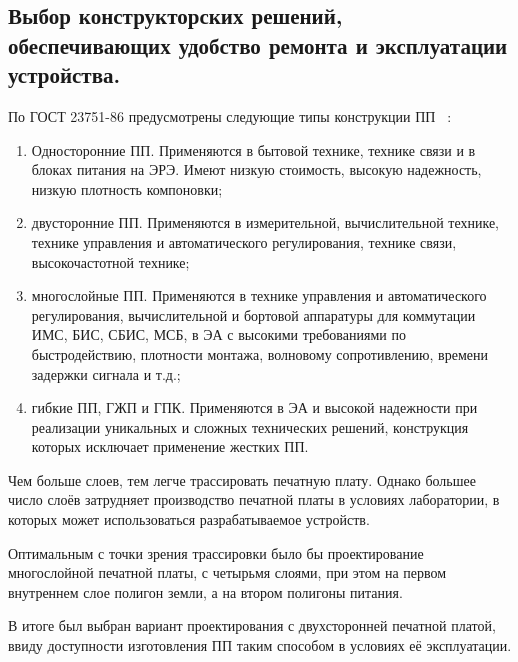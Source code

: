 \subsection{Выбор конструкторских решений, 
  обеспечивающих удобство ремонта
  и эксплуатации устройства.}

По ГОСТ 23751-86 предусмотрены следующие типы конструкции ПП
~\cite{PirogovaEngineering}:
\begin{enumerate}

\item Односторонние ПП. Применяются в бытовой технике, технике связи и
  в блоках питания на ЭРЭ. Имеют низкую стоимость, высокую надежность,
  низкую плотность компоновки;

\item двусторонние ПП. Применяются в измерительной, вычислительной
  технике, технике управления и автоматического регулирования,
  технике связи, высокочастотной технике;

\item многослойные ПП. Применяются в технике управления и
  автоматического регулирования,
  вычислительной и бортовой аппаратуры для
  коммутации ИМС, БИС, СБИС, МСБ, в ЭА с высокими требованиями по быстродействию,
  плотности монтажа,  волновому сопротивлению, времени задержки сигнала и т.д.;

\item гибкие ПП, ГЖП и ГПК. Применяются в ЭА и высокой надежности
  при реализации уникальных и сложных технических решений,
  конструкция которых исключает применение жестких ПП.
\end{enumerate}

Чем больше слоев, тем легче трассировать печатную плату.
Однако большее число слоёв затрудняет производство печатной платы
в условиях лаборатории, в которых может использоваться разрабатываемое
устройств.

Оптимальным с точки зрения трассировки было бы проектирование
многослойной печатной платы, с четырьмя слоями, при этом на первом
внутреннем слое полигон земли, а на втором полигоны питания.

В итоге был выбран вариант проектирования с двухсторонней печатной платой,
ввиду доступности изготовления ПП таким способом в условиях её
эксплуатации.



